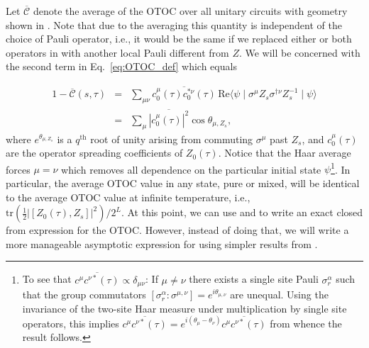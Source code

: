 \documentclass[aps,prb,twocolumn,superscriptaddress]{revtex4-1}
\begin{document}
Let $\overline{\mathcal{C}}$ denote the average of the OTOC over all unitary circuits with geometry shown in . Note that due to the averaging this quantity is independent of the choice of Pauli operator, i.e., it would be the same if we replaced either or both operators in  with another local Pauli different from $Z$. We will be concerned with the second term in Eq.~\eqref{eq:OTOC_def} which equals

\begin{eqnarray}\label{eq:OTOC_from_c}
1-\overline{\mathcal{C}}(s,\tau) & = & \sum_{\mu\nu}\overline{c_0^{\mu}(\tau)c_0^{*\nu}(\tau)}\,\text{Re}\langle\psi\mid\sigma^{\mu}Z_{s}\sigma^{\dagger\nu}Z_{s}^{-1}\mid\psi\rangle \nonumber\\
 & = & \sum_{\mu}\overline{\left|c_0^{\mu}(\tau)\right|^{2}}\cos\theta_{\mu,Z_{s}},
\end{eqnarray}
where $e^{\theta_{\mu,Z_{s}}}$ is  a $q^{\text{th}}$ root of unity arising from commuting $\sigma^{\mu}$ past $Z_{s}$, and $c_0^{\mu}(\tau)$ are the operator spreading coefficients of $Z_0(\tau)$. Notice that the Haar average forces $\mu=\nu$ which removes all dependence on the particular initial state $\psi$\footnote{To see that $\overline{c^\mu c^{\nu*}(\tau)} \propto \delta_{\mu \nu}$: If $\mu\neq\nu$ there exists a single site Pauli $\sigma^\alpha_r$ such that the group commutators $[\sigma^{\alpha}_r:\sigma^{\mu,\nu}]=e^{i \theta_{\mu,\nu}}$ are unequal. Using the invariance of the two-site Haar measure under multiplication by single site operators, this implies $\overline{c^\mu c^{\nu*}(\tau)} = e^{i(\theta_{\mu} - \theta_{\nu})} \overline{c^\mu c^{\nu*}(\tau)}$ from whence the result follows.}. In particular, the average OTOC value in any state, pure or mixed, will be identical to the average OTOC value at infinite temperature, i.e., $\text{tr} (\frac{1}{2}|[Z_{0}(\tau),Z_{s}]|^{2})/2^L$. At this point, we can use  and  to write an exact closed from expression for the OTOC. However, instead of doing that, we will write a more manageable asymptotic expression for  using simpler results from .
\end{document}
